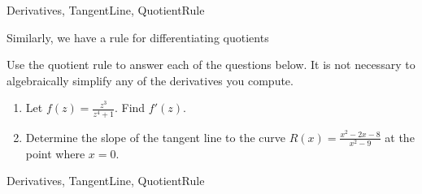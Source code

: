 \begin{tagblock}{Derivatives, TangentLine, QuotientRule}
\begin{question}
	









Similarly, we have a rule for differentiating quotients

\noindent{}

\bigskip

Use the quotient rule to answer each of the questions below.  It is not necessary to algebraically simplify any of the derivatives you compute.
\begin{enumerate}
\item  Let $\displaystyle f(z)=\frac{z^3}{z^4+1}.$  Find $f'(z)$.
\vspace{1in}
\item Determine the slope of the tangent line to the curve $\displaystyle R(x)=\frac{x^2-2x-8}{x^2-9}$ at the point where $x=0$.  
\end{enumerate}





	
	
\begin{tags}
	    Derivatives, TangentLine, QuotientRule
\end{tags}
	
\begin{diary}
\end{diary}
	
\begin{solution}
	   
\end{solution}
	
\end{question}

\end{tagblock}

